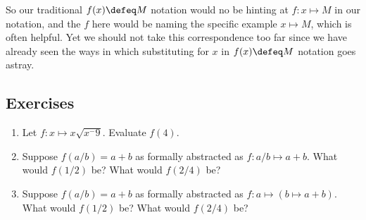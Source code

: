 So our traditional $f(x)\defeq M$ notation would no be hinting at 
$f:x\mapsto M$ in our notation, and the $f$ here would be naming 
the specific example $x\mapsto M$, which is often helpful.  Yet 
we should not take this correspondence too far since we have already 
seen the ways in which substituting for $x$ in $f(x)\defeq M$ notation 
goes astray.







\subsection{Exercises}
\begin{enumerate}
    \item Let $f:x\mapsto x\sqrt{x^-9}$.  Evaluate $f(4)$.

    \item Suppose $f(a/b)=a+b$ as formally abstracted as $f:a/b\mapsto a+b$.  What would $f(1/2)$ be?
    What would $f(2/4)$ be? 

    \item Suppose $f(a/b)=a+b$ as formally abstracted as $f:a\mapsto (b\mapsto a+b)$.  What would $f(1/2)$ be?
    What would $f(2/4)$ be?  

\end{enumerate}